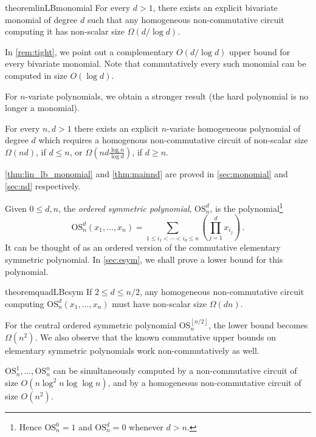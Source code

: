 \documentclass[10pt,a4paper]{article}
\def\floor#1{\left\lfloor #1 \right\rfloor}
\def\inparen#1{\left( #1 \right)}
\newcommand{\esym}[2]{\mathrm{OS}_{#1}^{#2}}
\begin{document}
\begin{restatable}{theorem}{linLBmonomial}\label{thm:lin_lb_monomial}
  For every $d>1$, there exists an explicit bivariate monomial of degree $d$ such that any homogeneous non-commutative circuit computing it has non-scalar size $\Omega(d/\log d)$.
\end{restatable}


\noindent In \autoref{rem:tight}, we point out a complementary $O(d/\log d)$ upper bound for every bivariate monomial. 
Note that commutatively every such monomial can be computed in size $O(\log d)$.

For $n$-variate polynomials, we obtain a stronger result (the hard polynomial is no longer a monomial).   


\begin{theorem}\label{thm:mainnd} For every $n,d>1$ there exists an explicit $n$-variate homogeneous polynomial of degree $d$ which requires a homogenous  non-commutative circuit of non-scalar size $\Omega(nd)$, if $d\leq n$, or $\Omega(nd \frac{\log n}{\log d})$, if $d\geq n$.  
\end{theorem}


\noindent \autoref{thm:lin_lb_monomial} and \autoref{thm:mainnd} are proved in \autoref{sec:monomial} and \autoref{sec:nd} respectively.


Given $0\leq d, n$, the \emph{ordered symmetric polynomial}, $\esym{n}{d}$, is the polynomial\footnote{Hence $\esym{n}{0}=1$ and $\esym{n}{d}=0$ whenever $d>n$.}
\[ 
 \esym{n}{d}(x_1,\dots,x_n) = \sum_{1\leq i_1 < \cdots < i_d \leq n} \inparen{\prod_{j=1}^{d} x_{i_j}}\,.
\]
It can be thought of as an ordered version of the commutative elementary symmetric polynomial. 
In \autoref{sec:esym}, we shall prove a lower bound for this polynomial.

\begin{restatable}{theorem}{quadLBcsym}\label{thm:quad_lb_csym}
  If $2\leq d\leq n/2$, any homogeneous non-commutative circuit computing $\esym{n}{d}(x_1,\dots,x_n)$ must have non-scalar size $\Omega(dn)$.
\end{restatable}

For the central ordered symmetric polynomial $\esym{n}{\floor{n/2}}$, the lower bound becomes $\Omega(n^2)$. 
We also observe that the known commutative upper bounds on elementary symmetric polynomials work non-commutatively as well.

\begin{proposition}\label{prop:ub}
  $\esym{n}{1}, \dots, \esym{n}{n}$ can be simultaneously computed by a non-commutative circuit of size $O(n\log^2n\log\log n)$, and by a homogeneous non-commutative circuit of size $O(n^2)$. 
\end{proposition}
 
\end{document}
